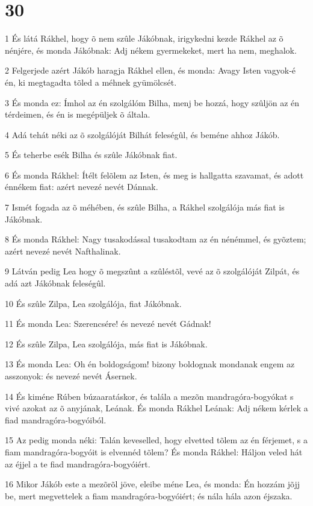 \chapter{30}

\par 1 És látá Rákhel, hogy õ nem szûle Jákóbnak, irigykedni kezde Rákhel az õ nénjére, és monda Jákóbnak: Adj nékem gyermekeket, mert ha nem, meghalok.
\par 2 Felgerjede azért Jákób haragja Rákhel ellen, és monda: Avagy Isten vagyok-é én, ki megtagadta tõled a méhnek gyümölcsét.
\par 3 És monda ez: Ímhol az én szolgálóm Bilha, menj be hozzá, hogy szûljön az én térdeimen, és én is megépüljek õ általa.
\par 4 Adá tehát néki az õ szolgálóját Bilhát feleségûl, és beméne ahhoz Jákób.
\par 5 És teherbe esék Bilha és szûle Jákóbnak fiat.
\par 6 És monda Rákhel: Ítélt felõlem az Isten, és meg is hallgatta szavamat, és adott énnékem fiat: azért nevezé nevét Dánnak.
\par 7 Ismét fogada az õ méhében, és szûle Bilha, a Rákhel szolgálója más fiat is Jákóbnak.
\par 8 És monda Rákhel: Nagy tusakodással tusakodtam az én nénémmel, és gyõztem; azért nevezé nevét Nafthalinak.
\par 9 Látván pedig Lea hogy õ megszûnt a szûléstõl, vevé az õ szolgálóját Zilpát, és adá azt Jákóbnak feleségûl.
\par 10 És szûle Zilpa, Lea szolgálója, fiat Jákóbnak.
\par 11 És monda Lea: Szerencsére! és nevezé nevét Gádnak!
\par 12 És szûle Zilpa, Lea szolgálója, más fiat is Jákóbnak.
\par 13 És monda Lea: Oh én boldogságom! bizony boldognak mondanak engem az asszonyok: és nevezé nevét Ásernek.
\par 14 És kiméne Rúben búzaaratáskor, és talála a mezõn mandragóra-bogyókat s vivé azokat az õ anyjának, Leának. És monda Rákhel Leának: Adj nékem kérlek a fiad mandragóra-bogyóiból.
\par 15 Az pedig monda néki: Talán keveselled, hogy elvetted tõlem az én férjemet, s a fiam mandragóra-bogyóit is elvennéd tõlem? És monda Rákhel: Háljon veled hát az éjjel a te fiad mandragóra-bogyóiért.
\par 16 Mikor Jákób este a mezõrõl jöve, eleibe méne Lea, és monda: Én hozzám jõjj be, mert megvettelek a fiam mandragóra-bogyóiért; és nála hála azon éjszaka.
